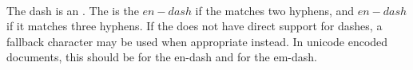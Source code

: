  \\

The dash is an . The  is the \inline$en-dash$ if the  matches two hyphens, and \inline$en-dash$ if it matches three hyphens. If the  does not have direct support for dashes, a fallback character may be used when appropriate instead. In unicode encoded documents, this should be  for the en-dash and  for the em-dash. \\

\begin{examples}
\end{examples}


